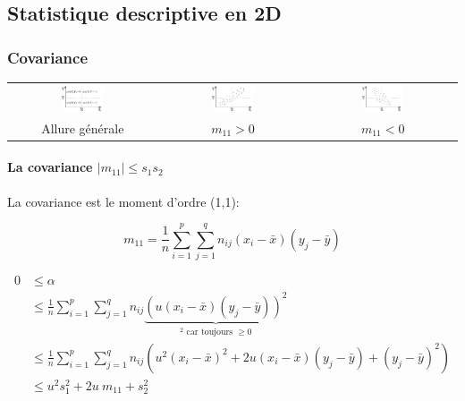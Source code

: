 \subsection{Statistique descriptive en 2D}


\subsubsection{Covariance}

\begin{center}
	\begin{tabular}{ccc}
		\includegraphics[width=0.3\textwidth]{images/covariance-all.pdf}&\includegraphics[width=0.3\textwidth]{images/covariance-positive.pdf}&\includegraphics[width=0.3\textwidth]{images/covariance-negative.pdf}\\
		Allure générale&$m_{11}>0$&$m_{11}<0$
	\end{tabular}
\end{center}





\paragraph{La covariance $|m_{11}| \leq s_1s_2$}

La covariance est le moment d'ordre (1,1):

$$m_{11}=\frac{1}{n} \sum_{i=1}^{p} \sum_{j=1}^{q} n_{ij} (x_i-\bar{x})(y_j-\bar{y})$$

\begin{align*}
	0 &\leq \alpha\\
	  &\leq \frac{1}{n} \sum_{i=1}^{p} \sum_{j=1}^{q} n_{ij} \underbrace{ ( u (x_i-\bar{x})(y_j-\bar{y}))^2 }_\text{$^2$ car toujours $\geq 0$} \\
	  &\leq \frac{1}{n} \sum_{i=1}^{p} \sum_{j=1}^{q} n_{ij} (u^2(x_i-\bar{x})^2 + 2u(x_i-\bar{x})(y_j-\bar{y})+(y_j-\bar{y})^2)\\
	  &\leq u^2s_1^2+2u\ m_{11}+s_2^2
\end{align*}

